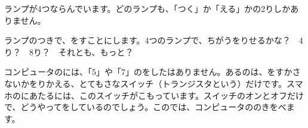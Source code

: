\begin{hatena}
\noindent\begin{minipage}[c]{0.58\linewidth}
ランプが4つならんでいます。どのランプも、「つく」か「える」かの2りしかありません。

ランプのつきで、をすことにします。4つのランプで、ちがうをりせるかな？　4り？　8り？　それとも、もっと？
\end{minipage}\hfill
\begin{minipage}[c]{0.38\linewidth}\centering
{}
\end{minipage}
\end{hatena}

コンピュータのには、「5」や「7」のをしたはありません。あるのは、をすかさないかをりかえる、とてもさなスイッチ（トランジスタという）だけです。スマホのにあたるには、このスイッチがこもっています。スイッチのオンとオフだけで、どうやってをしているのでしょう。このでは、コンピュータののきをべます。

